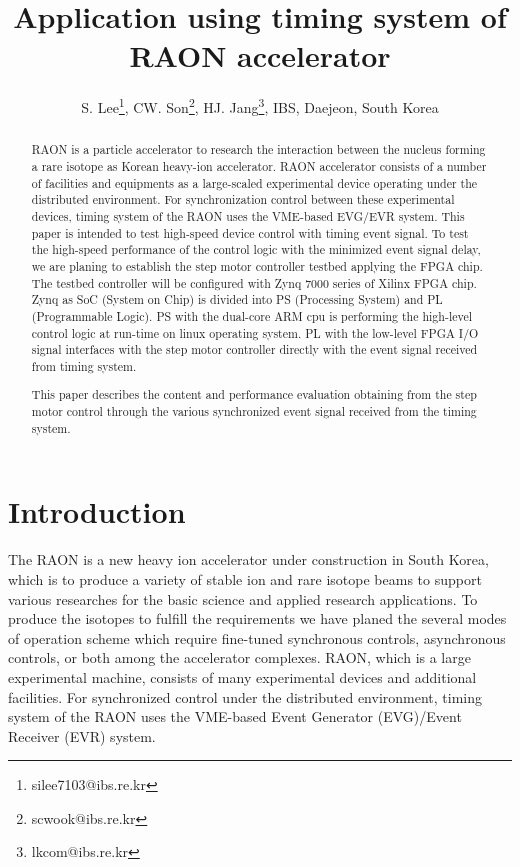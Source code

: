 \documentclass[a4paper,
              ]{jacow}
\begin{document}
\title{Application using timing system of RAON accelerator}
\author{S. Lee\thanks{silee7103@ibs.re.kr}, CW. Son\thanks{scwook@ibs.re.kr}, HJ. Jang\thanks{lkcom@ibs.re.kr}, IBS, Daejeon, South Korea\\
       }
\maketitle

%
\begin{abstract}
   RAON is a particle accelerator to research the interaction between the nucleus forming a rare isotope as Korean heavy-ion accelerator. RAON accelerator consists of a number of facilities and equipments as a large-scaled experimental device operating under the distributed environment. For synchronization control between these experimental devices, timing system of the RAON uses the VME-based EVG/EVR system. This paper is intended to test high-speed device control with timing event signal. To test the high-speed performance of the control logic with the minimized event signal delay, we are planing to establish the step motor controller testbed applying the FPGA chip. The testbed controller will be configured with Zynq 7000 series of Xilinx FPGA chip. Zynq as SoC (System on Chip) is divided into PS (Processing System) and PL (Programmable Logic). PS with the dual-core ARM cpu is performing the high-level control logic at run-time on linux operating system. PL with the low-level FPGA I/O signal interfaces with the step motor controller directly with the event signal received from timing system.
   
   This paper describes the content and performance evaluation obtaining from the step motor control through the various synchronized event signal received from the timing system.
\end{abstract}


\section{Introduction}
The RAON\cite{TSHOO:NIMB} is a new heavy ion accelerator under construction in South Korea, which is to produce a variety of stable ion and rare isotope beams to support various researches for the basic science and applied research applications. To produce the isotopes to fulfill the requirements we have planed the several modes of operation scheme which require fine-tuned synchronous controls, asynchronous controls, or both among the accelerator complexes. RAON, which is a large experimental machine, consists of many experimental devices and additional facilities. For synchronized control under the distributed environment, timing system of the RAON uses the VME-based Event Generator (EVG)/Event Receiver (EVR)\cite{mrf} system.
\end{document}
